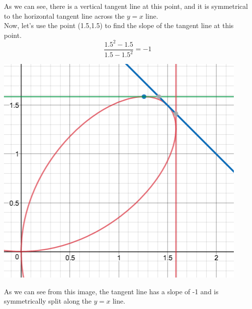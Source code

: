 \documentclass[a4paper,openright, 10pt]{article}
\begin{document}
As we can see, there is a vertical tangent line at this point, and it is symmetrical to the horizontal tangent line across the $y=x$ line.\\
Now, let's use the point (1.5,1.5) to find the slope of the tangent line at this point. 
$$\frac{1.5^2-1.5}{1.5-1.5^2}=-1$$
\begin{center}
    \includegraphics[scale=0.5]{graph9}
\end{center}
As we can see from this image, the tangent line has a slope of -1 and is symmetrically split along the $y=x$ line.
\end{document}
